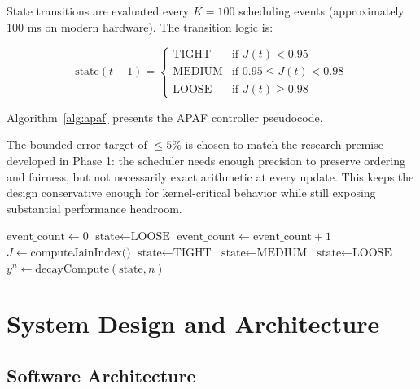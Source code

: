 \documentclass[conference]{IEEEtran}
\begin{document}
State transitions are evaluated every $K = 100$ scheduling events (approximately $100$ ms on modern hardware). The transition logic is:

\begin{equation}
\text{state}(t+1) = \begin{cases}
\text{TIGHT} & \text{if } J(t) < 0.95 \\
\text{MEDIUM} & \text{if } 0.95 \leq J(t) < 0.98 \\
\text{LOOSE} & \text{if } J(t) \geq 0.98
\end{cases}
\label{eq:apaf_transition}
\end{equation}

Algorithm~\ref{alg:apaf} presents the APAF controller pseudocode.

The bounded-error target of $\leq 5\%$ is chosen to match the research premise developed in Phase 1: the scheduler needs enough precision to preserve ordering and fairness, but not necessarily exact arithmetic at every update. This keeps the design conservative enough for kernel-critical behavior while still exposing substantial performance headroom.

\begin{algorithm}
\caption{APAF Controller Update}
\label{alg:apaf}
\begin{algorithmic}[1]
\State $\text{event\_count} \gets 0$
\State $\text{state} \gets \text{LOOSE}$
    \State $\text{event\_count} \gets \text{event\_count} + 1$
        \State $J \gets \text{computeJainIndex()}$
            \State $\text{state} \gets \text{TIGHT}$
            \State $\text{state} \gets \text{MEDIUM}$
        \Else
            \State $\text{state} \gets \text{LOOSE}$
        \EndIf
    \EndIf
    \State $y^n \gets \text{decayCompute}(\text{state}, n)$
\EndProcedure
\end{algorithmic}
\end{algorithm}

\section{System Design and Architecture}\label{sec:design}

\subsection{Software Architecture}
\end{document}
